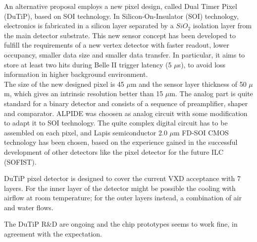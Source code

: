 An alternative proposal employs a new pixel design, called Dual Timer Pixel (DuTiP), based on SOI technology. In Silicon-On-Insulator (SOI) technology, electronics is fabricated in a silicon layer separated by a $SiO_{2}$ isolation layer from the main detector substrate.
This new sensor concept has been developed to fulfill the requirements of a new vertex detector with faster readout, lower occupancy, smaller data size and smaller data transfer. In particular, it aims to store at least two hits during Belle II trigger latency (5 $\mu$s), to avoid loss information in higher background environment. \\

The size of the new designed pixel is 45 $\mu$m and the sensor layer thickness of 50 $\mu$m, which gives an intrinsic resolution better than 15 $\mu$m. The analog part is quite standard for a binary detector and consists of a sequence of preamplifier, shaper and comparator.  ALPIDE was choosen as analog circuit with some modification to adapt it to SOI technology. 
The quite complex digital circuit has to be assembled on each pixel, and Lapis semiconductor 2.0 $\mu$m FD-SOI CMOS technology has been chosen, based on the experience gained in the successful development of other detectors like the pixel detector for the future ILC (SOFIST).

DuTiP pixel detector is designed to cover the current VXD acceptance with 7 layers. For the inner layer of the detector might be possible the cooling with airflow at room temperature; for the outer layers instead, a combination of air and water flows.

The DuTiP R\&D are ongoing and the chip prototypes seems to work fine, in agreement with the expectation. 




























